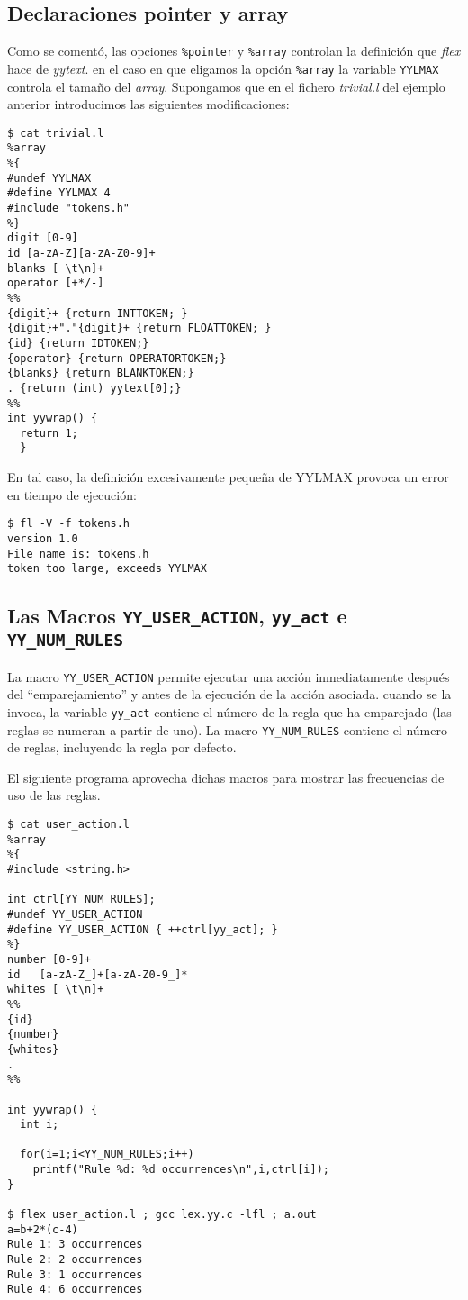 \subsection{Declaraciones pointer y array}
Como se coment\'o, las opciones \verb|%pointer| y \verb|%array|
controlan la definici\'on que
\emph{flex} hace de \emph{yytext}. en el caso en que eligamos la opci\'on 
\verb|%array| la variable \verb|YYLMAX| controla el tama\~no del
\emph{array}. Supongamos que en el fichero \emph{trivial.l} del ejemplo
anterior introducimos las siguientes modificaciones:
\begin{verbatim}
$ cat trivial.l
%array
%{
#undef YYLMAX
#define YYLMAX 4
#include "tokens.h"
%}
digit [0-9]
id [a-zA-Z][a-zA-Z0-9]+
blanks [ \t\n]+
operator [+*/-]
%%
{digit}+ {return INTTOKEN; }
{digit}+"."{digit}+ {return FLOATTOKEN; }
{id} {return IDTOKEN;}
{operator} {return OPERATORTOKEN;}
{blanks} {return BLANKTOKEN;}
. {return (int) yytext[0];}
%%
int yywrap() {
  return 1;
  }                                        
\end{verbatim}
En tal caso, la definici\'on excesivamente peque\~na de YYLMAX provoca
un error en tiempo de ejecuci\'on:
\begin{verbatim}
$ fl -V -f tokens.h
version 1.0
File name is: tokens.h
token too large, exceeds YYLMAX 
\end{verbatim}

\subsection{Las Macros {\tt YY\_USER\_ACTION}, {\tt yy\_act} e {\tt YY\_NUM\_RULES}}
La macro \verb|YY_USER_ACTION| permite ejecutar una acción inmediatamente después del ``emparejamiento'' y antes de  la ejecución de la acción asociada.
cuando se la invoca, la variable \verb|yy_act| contiene el número de la regla que ha emparejado (las reglas se numeran a partir de uno). La macro \verb|YY_NUM_RULES| contiene el número de reglas, incluyendo la regla por defecto.

El siguiente programa aprovecha
dichas macros para mostrar las frecuencias de uso de las reglas.
\begin{verbatim}
$ cat user_action.l
%array
%{
#include <string.h>
 
int ctrl[YY_NUM_RULES];
#undef YY_USER_ACTION
#define YY_USER_ACTION { ++ctrl[yy_act]; }
%}
number [0-9]+
id   [a-zA-Z_]+[a-zA-Z0-9_]*
whites [ \t\n]+
%%
{id}
{number}
{whites}
.
%%
 
int yywrap() {
  int i;
 
  for(i=1;i<YY_NUM_RULES;i++)
    printf("Rule %d: %d occurrences\n",i,ctrl[i]);
}
                                                  
$ flex user_action.l ; gcc lex.yy.c -lfl ; a.out
a=b+2*(c-4)
Rule 1: 3 occurrences
Rule 2: 2 occurrences
Rule 3: 1 occurrences
Rule 4: 6 occurrences     
\end{verbatim}

